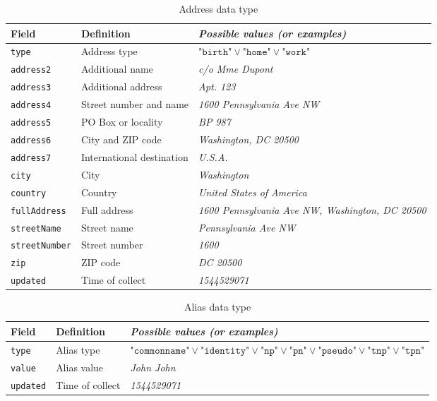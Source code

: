 \documentclass[twoside,twocolumn]{article}
\theoremstyle{definition}
\theoremstyle{remark}
\begin{document}
\begin{table}[htb]
    \centering
    \caption{Address data type}
    \begin{tabular*}{\textwidth}{l|l||l}
        Field & Definition & \textit{Possible values (or examples)} \\
        \hline \hline
        \texttt{type} & Address type & $\texttt{"birth"} \vee \texttt{"home"} \vee \texttt{"work"}$ \\
        \hline
        \texttt{address2} & Additional name & \textit{c/o Mme Dupont} \\
        \hline
        \texttt{address3} & Additional address & \textit{Apt. 123} \\
        \hline
        \texttt{address4} & Street number and name & \textit{1600 Pennsylvania Ave NW} \\
        \hline
        \texttt{address5} & PO Box or locality & \textit{BP 987} \\
        \hline
        \texttt{address6} & City and ZIP code & \textit{Washington, DC 20500} \\
        \hline
        \texttt{address7} & International destination & \textit{U.S.A.} \\
        \hline
        \texttt{city} & City & \textit{Washington} \\
        \hline
        \texttt{country} & Country & \textit{United States of America} \\
        \hline
        \texttt{fullAddress} & Full address & \textit{1600 Pennsylvania Ave NW, Washington, DC 20500} \\
        \hline
        \texttt{streetName} & Street name & \textit{Pennsylvania Ave NW} \\
        \hline
        \texttt{streetNumber} & Street number & \textit{1600} \\
        \hline
        \texttt{zip} & ZIP code & \textit{DC 20500} \\
        \hline
        \texttt{updated} & Time of collect & \textit{1544529071}
        \label{table:address}
    \end{tabular*}
\end{table}

\begin{table}[htb]
    \centering
    \caption{Alias data type}
    \begin{tabular*}{1.05\textwidth}{l|l||l}
        Field & Definition & \textit{Possible values (or examples)} \\
        \hline \hline
        \texttt{type} & Alias type & $\texttt{"commonname"} \vee \texttt{"identity"} \vee \texttt{"np"} \vee \texttt{"pn"} \vee \texttt{"pseudo"} 
            \vee \texttt{"tnp"} \vee \texttt{"tpn"}$ \\
        \hline
        \texttt{value} & Alias value & \textit{John John} \\
        \hline
        \texttt{updated} & Time of collect & \textit{1544529071}
        \label{table:aliases}
    \end{tabular*}
\end{table}
\end{document}
